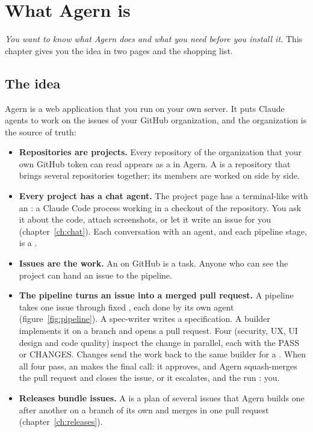\chapter{What Agern is}\label{ch:what}

\emph{You want to know what Agern does and what you need before you install it.} This chapter
gives you the idea in two pages and the shopping list.

\section{The idea}\label{sec:idea}

Agern is a web application that you run on your own server. It puts Claude agents to work on
the issues of your GitHub organization, and the organization is the source of truth:

\begin{itemize}
  \item \textbf{Repositories are projects.} Every repository of the organization that your own
    GitHub token can read appears as a  in Agern. A  is a
    repository that brings several repositories together; its members are worked on side by side.
  \item \textbf{Every project has a chat agent.} The project page has a terminal-like
     with an : a Claude Code process working in a checkout of the
    repository. You ask it about the code, attach screenshots, or let it write an issue for you
    (chapter~\ref{ch:chat}). Each conversation with an agent, and each pipeline stage, is a
    .
  \item \textbf{Issues are the work.} An  on GitHub is a task. Anyone who can see the
    project can hand an issue to the pipeline.
  \item \textbf{The pipeline turns an issue into a merged pull request.} A pipeline 
    takes one issue through fixed , each done by its own agent
    (figure~\ref{fig:pipeline}). A spec-writer writes a specification. A builder implements it on
    a branch and opens a pull request. Four  (security, UX, UI design
    and code quality) inspect the change in parallel, each with the  PASS or
    CHANGES. Changes send the work back to the same builder for a . When
    all four pass, an  makes the final call: it approves, and Agern squash-merges
    the pull request and closes the issue, or it escalates, and the run : you.
  \item \textbf{Releases bundle issues.} A  is a plan of several issues that
    Agern builds one after another on a branch of its own and merges in one pull request
    (chapter~\ref{ch:releases}).
\end{itemize}

